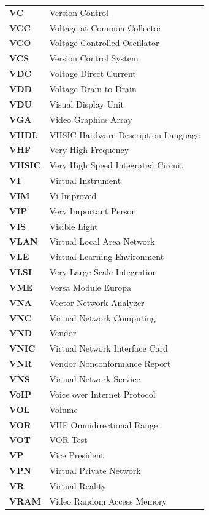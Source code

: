 \begin{longtable}{p{3cm}p{11cm}}
\textbf{VC} & Version Control \\
\textbf{VCC} & Voltage at Common Collector \\
\textbf{VCO} & Voltage-Controlled Oscillator \\
\textbf{VCS} & Version Control System \\
\textbf{VDC} & Voltage Direct Current \\
\textbf{VDD} & Voltage Drain-to-Drain \\
\textbf{VDU} & Visual Display Unit \\
\textbf{VGA} & Video Graphics Array \\
\textbf{VHDL} & VHSIC Hardware Description Language \\
\textbf{VHF} & Very High Frequency \\
\textbf{VHSIC} & Very High Speed Integrated Circuit \\
\textbf{VI} & Virtual Instrument \\
\textbf{VIM} & Vi Improved \\
\textbf{VIP} & Very Important Person \\
\textbf{VIS} & Visible Light \\
\textbf{VLAN} & Virtual Local Area Network \\
\textbf{VLE} & Virtual Learning Environment \\
\textbf{VLSI} & Very Large Scale Integration \\
\textbf{VME} & Versa Module Europa \\
\textbf{VNA} & Vector Network Analyzer \\
\textbf{VNC} & Virtual Network Computing \\
\textbf{VND} & Vendor \\
\textbf{VNIC} & Virtual Network Interface Card \\
\textbf{VNR} & Vendor Nonconformance Report \\
\textbf{VNS} & Virtual Network Service \\
\textbf{VoIP} & Voice over Internet Protocol \\
\textbf{VOL} & Volume \\
\textbf{VOR} & VHF Omnidirectional Range \\
\textbf{VOT} & VOR Test \\
\textbf{VP} & Vice President \\
\textbf{VPN} & Virtual Private Network \\
\textbf{VR} & Virtual Reality \\
\textbf{VRAM} & Video Random Access Memory \\

\end{longtable}
